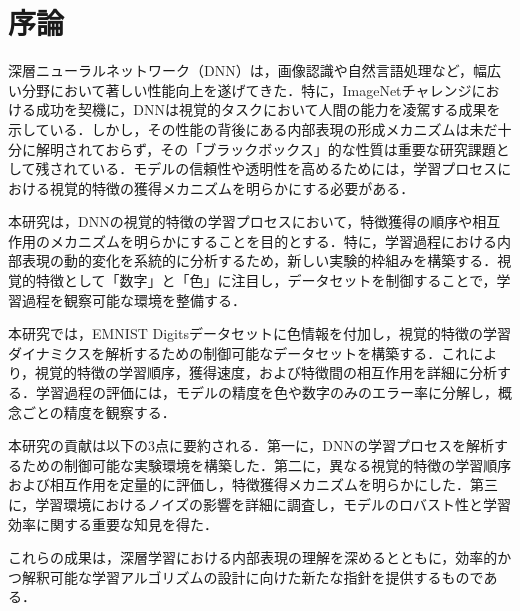 \chapter{序論}
深層ニューラルネットワーク（DNN）は，画像認識や自然言語処理など，幅広い分野において著しい性能向上を遂げてきた．特に，ImageNetチャレンジにおける成功を契機に，DNNは視覚的タスクにおいて人間の能力を凌駕する成果を示している\cite{ILSVRC15}．しかし，その性能の背後にある内部表現の形成メカニズムは未だ十分に解明されておらず，その「ブラックボックス」的な性質は重要な研究課題として残されている．モデルの信頼性や透明性を高めるためには，学習プロセスにおける視覚的特徴の獲得メカニズムを明らかにする必要がある．

本研究は，DNNの視覚的特徴の学習プロセスにおいて，特徴獲得の順序や相互作用のメカニズムを明らかにすることを目的とする．特に，学習過程における内部表現の動的変化を系統的に分析するため，新しい実験的枠組みを構築する．視覚的特徴として「数字」と「色」に注目し，データセットを制御することで，学習過程を観察可能な環境を整備する．

本研究では，EMNIST Digitsデータセットに色情報を付加し，視覚的特徴の学習ダイナミクスを解析するための制御可能なデータセットを構築する．これにより，視覚的特徴の学習順序，獲得速度，および特徴間の相互作用を詳細に分析する．学習過程の評価には，モデルの精度を色や数字のみのエラー率に分解し，概念ごとの精度を観察する．

本研究の貢献は以下の3点に要約される．第一に，DNNの学習プロセスを解析するための制御可能な実験環境を構築した．第二に，異なる視覚的特徴の学習順序および相互作用を定量的に評価し，特徴獲得メカニズムを明らかにした．第三に，学習環境におけるノイズの影響を詳細に調査し，モデルのロバスト性と学習効率に関する重要な知見を得た\cite{DBLP:conf/icml/BahdanauCB14}．

これらの成果は，深層学習における内部表現の理解を深めるとともに，効率的かつ解釈可能な学習アルゴリズムの設計に向けた新たな指針を提供するものである．
\newpage

